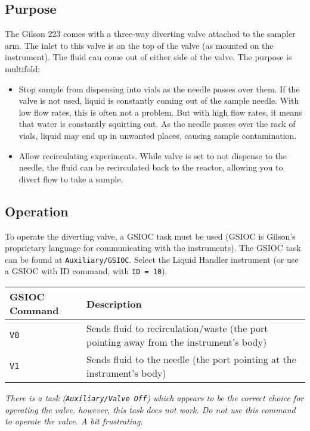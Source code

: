 \documentclass[11pt, oneside]{article}   	%
\begin{document}
\begin{enumerate}
\subsection{Purpose}
The Gilson 223 comes with a three-way diverting valve attached to the sampler arm. The inlet to this valve is on the top of the valve (as mounted on the instrument). The fluid can come out of either side of the valve. The purpose is multifold:

\begin{itemize}
	\item Stop sample from dispensing into vials as the needle passes over them. If the valve is not used, liquid is constantly coming out of the sample needle. With low flow rates, this is often not a problem. But with high flow rates, it means that water is constantly squirting out. As the needle passes over the rack of vials, liquid may end up in unwanted places, causing sample contamination.
	\item Allow recirculating experiments. While valve is set to not dispense to the needle, the fluid can be recirculated back to the reactor, allowing you to divert flow to take a sample.
\end{itemize}

\subsection{Operation}
To operate the diverting valve, a GSIOC task must be used (GSIOC is Gilson's proprietary language for communicating with the instruments). The GSIOC task can be found at \texttt{Auxiliary/GSIOC}. Select the Liquid Handler instrument (or use a GSIOC with ID command, with \texttt{ID = 10}).

\begin{center}
	\begin{tabular}{l p{10cm}}
		\hline
		GSIOC Command & Description \\
		\hline \hline
		\texttt{V0} & Sends fluid to recirculation/waste (the port pointing away from the instrument's body)\\
		\texttt{V1} & Sends fluid to the needle  (the port pointing at the instrument's body) \\
		\hline
	\end{tabular}
\end{center}

\textit{There is a task (\texttt{Auxiliary/Valve Off}) which appears to be the correct choice for operating the valve. however, this task does not work. Do not use this command to operate the valve. A bit frustrating.}


\end{enumerate}
\end{document}
